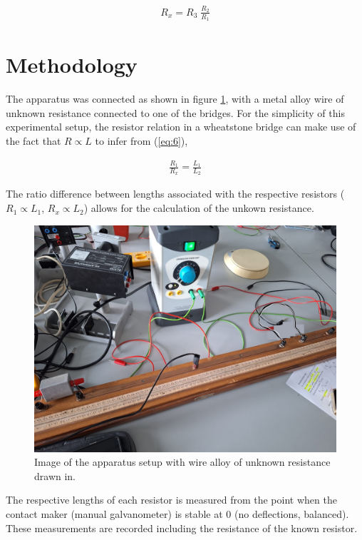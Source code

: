 \documentclass[12pt]{article}
\begin{document}
\vspace{-2ex}
\begin{gather} \label{eq:7}
    R_x = R_3 \; \frac{R_2}{R_1}
\end{gather}

\section{Methodology} \label{sec:2}

The apparatus was connected as shown in figure \ref{fig:setup}, with a metal alloy wire of unknown resistance connected to one of the bridges.
For the simplicity of this experimental setup, the resistor relation in a wheatstone bridge can make use of the fact that $R \propto L$ to infer from (\ref{eq:6}),

\vspace{-2ex}
\begin{gather} \label{eq:9}
    \frac{R_1}{R_x} = \frac{L_1}{L_2}
\end{gather}

The ratio difference between lengths associated with the respective resistors ($R_1 \propto L_1$, $R_x \propto L_2$) allows for the calculation of the unkown resistance.

\begin{figure}[H]
    \centering
    \includegraphics[width=.75\textwidth]{wheatstone apparatus.jpeg}
    \caption{\centering Image of the apparatus setup with wire alloy of unknown resistance drawn in.}
    \label{fig:setup}
\end{figure}

The respective lengths of each resistor is measured from the point when the contact maker (manual galvanometer) is stable at 0 (no deflections, balanced). These measurements are
recorded including the resistance of the known resistor.
\end{document}

